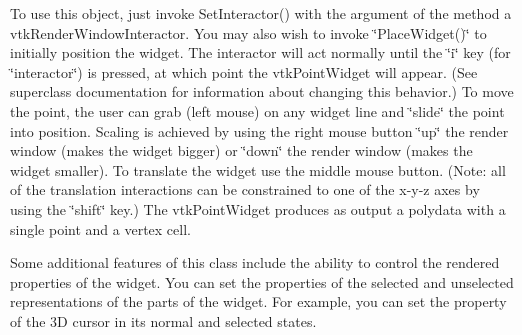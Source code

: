 To use this object, just invoke Set\-Interactor() with the argument of the method a vtk\-Render\-Window\-Interactor. You may also wish to invoke \char`\"{}\-Place\-Widget()\char`\"{} to initially position the widget. The interactor will act normally until the \char`\"{}i\char`\"{} key (for \char`\"{}interactor\char`\"{}) is pressed, at which point the vtk\-Point\-Widget will appear. (See superclass documentation for information about changing this behavior.) To move the point, the user can grab (left mouse) on any widget line and \char`\"{}slide\char`\"{} the point into position. Scaling is achieved by using the right mouse button \char`\"{}up\char`\"{} the render window (makes the widget bigger) or \char`\"{}down\char`\"{} the render window (makes the widget smaller). To translate the widget use the middle mouse button. (Note\-: all of the translation interactions can be constrained to one of the x-\/y-\/z axes by using the \char`\"{}shift\char`\"{} key.) The vtk\-Point\-Widget produces as output a polydata with a single point and a vertex cell.

Some additional features of this class include the ability to control the rendered properties of the widget. You can set the properties of the selected and unselected representations of the parts of the widget. For example, you can set the property of the 3\-D cursor in its normal and selected states.

